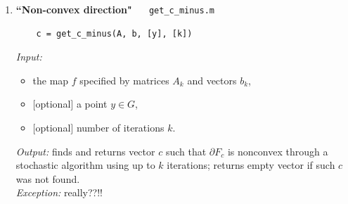 \documentclass[a4paper]{article}
\newcommand{\R}{\mathbb{R}}
\theoremstyle{definition}
\begin{document}
\begin{enumerate}
%
%
%
%

\item {\bf ``Non-convex direction"\ \ \  }{\tt get\_c\_minus.m} 
	\begin{verbatim}
	c = get_c_minus(A, b, [y], [k])
	\end{verbatim}
{\it Input:}
\begin{itemize}
	\item the map $f$ specified by matrices $A_k$ and vectors $b_k$,
	\item  $[$optional$]$ a point $y\in G$,
	\item $[$optional$]$ number of iterations $k$.
\end{itemize}
{\it Output:}  finds and returns vector $c$ such that $\partial F_c$ is nonconvex through a stochastic algorithm using up to $k$ iterations; returns empty vector if such $c$ was not  found.\\
{\it Exception:} really??!!


\end{enumerate}
\end{document}
